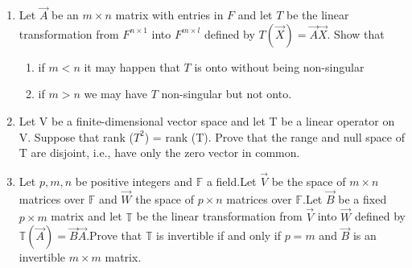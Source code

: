 \begin{enumerate}[label=\thesubsection.\arabic*.,ref=\thesubsection.\theenumi]
%
\item Let $\vec{A}$ be an $m \times n$ matrix with entries in $F$ and let $T$ be the linear transformation from $F^{n \times1 }$ into $F^{m \times l}$ defined by $T(\vec{X}) = \vec{A}\vec{X}$. Show that 
\begin{enumerate}
\item
if $m < n$ it may happen that $T$ is onto without being non-singular
\item
if $m>n$ we may have $T$ non-singular but not onto.
\\
\end{enumerate}
%
\solution

\item Let V be a finite-dimensional vector space and let T be a linear operator on V. Suppose that rank ($T^2$) = rank (T). Prove that the range and null space of T are disjoint, i.e., have only the zero vector in common.
%
%
\solution

%
\item Let $p,m,n$ be positive integers and $\mathbb{F}$ a field.Let $\vec{V}$ be the space of $m \times n$ matrices over $\mathbb{F}$ and $\vec{W}$ the space of $p \times n$ matrices over $\mathbb{F}$.Let $\vec{B}$ be a fixed $p \times m$ matrix and let $\mathbb{T}$ be the linear transformation from $\vec{V}$ into $\vec{W}$ defined by $\mathbb{T}(\vec{A})=\vec{B}\vec{A}$.Prove that $\mathbb{T}$ is invertible if and only if $p=m$ and $\vec{B}$ is an invertible $m \times m$ matrix. 
%
\solution


\end{enumerate}
